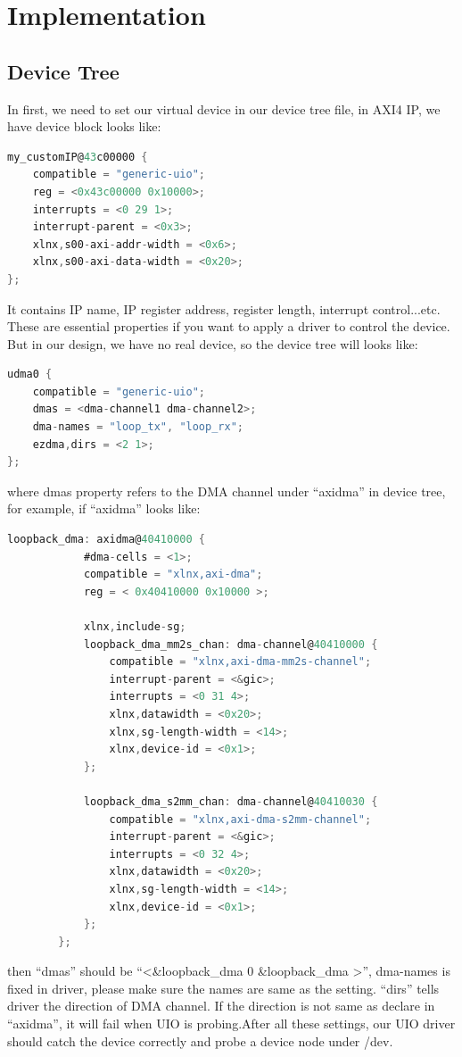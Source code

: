 
\section{Implementation}
\label{sec:Implementation}

\subsection{Device Tree}
\label{subsec:Device Tree}
In first, we need to set our virtual device in our device tree file, in AXI4 IP, we have device block looks like:
\begin{lstlisting}[frame=single,language=C]
my_customIP@43c00000 {
	compatible = "generic-uio";
	reg = <0x43c00000 0x10000>;
	interrupts = <0 29 1>;
	interrupt-parent = <0x3>;
	xlnx,s00-axi-addr-width = <0x6>;
	xlnx,s00-axi-data-width = <0x20>;
};
\end{lstlisting}
It contains IP name, IP register address, register length, interrupt control...etc. These are essential properties if you want to apply a driver to control the device. But in our design, we have no real device, so the device tree will looks like:
\begin{lstlisting}[frame=single,language=C]
udma0 {
    compatible = "generic-uio";
    dmas = <dma-channel1 dma-channel2>;
    dma-names = "loop_tx", "loop_rx";   
    ezdma,dirs = <2 1>;                 
};
\end{lstlisting}
where dmas property refers to the DMA channel under ``axidma'' in device tree, for example, if ``axidma'' looks like:
\begin{lstlisting}[frame=single,language=C]
        loopback_dma: axidma@40410000 {
            #dma-cells = <1>;
            compatible = "xlnx,axi-dma";
            reg = < 0x40410000 0x10000 >;

            xlnx,include-sg;
            loopback_dma_mm2s_chan: dma-channel@40410000 {
                compatible = "xlnx,axi-dma-mm2s-channel";
                interrupt-parent = <&gic>;
                interrupts = <0 31 4>; 
                xlnx,datawidth = <0x20>;        
                xlnx,sg-length-width = <14>;    
                xlnx,device-id = <0x1>;     
            };

            loopback_dma_s2mm_chan: dma-channel@40410030 {
                compatible = "xlnx,axi-dma-s2mm-channel";
                interrupt-parent = <&gic>;
                interrupts = <0 32 4>;  
                xlnx,datawidth = <0x20>;       
                xlnx,sg-length-width = <14>;    
                xlnx,device-id = <0x1>;    
            };
        };
\end{lstlisting}
then ``dmas'' should be ``<\&loopback\_dma 0 \&loopback\_dma >'', dma-names is fixed in driver, please make sure the names are same as the setting. ``dirs'' tells driver the direction of DMA channel. If the direction is not same as declare in ``axidma'', it will fail when UIO is probing.After all these settings, our UIO driver should catch the device correctly and probe a device node under /dev.

